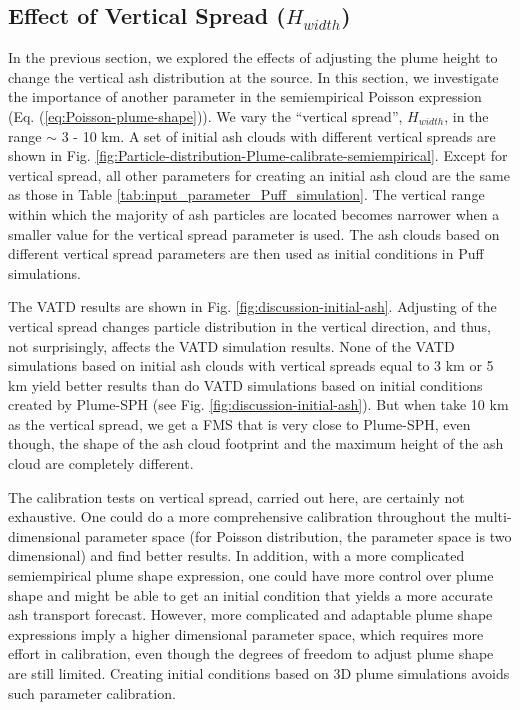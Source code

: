 \documentclass[utf8]{frontiersSCNS} %
\begin{document}
\subsection{Effect of Vertical Spread ($H_{width}$)}
In the previous section, we explored the effects of adjusting the plume height to change the vertical ash distribution at the source. In this section, we investigate the importance of another parameter in the semiempirical Poisson expression (Eq. (\ref{eq:Poisson-plume-shape})). We vary the ``vertical spread'', $H_{width}$, in the range $\sim$ 3 - 10 km. A set of initial ash clouds  with different vertical spreads are shown in Fig. \ref{fig:Particle-distribution-Plume-calibrate-semiempirical}. Except for vertical spread, all other parameters for creating an initial ash cloud are the same as those in Table \ref{tab:input_parameter_Puff_simulation}. The vertical range within which the majority of ash particles are located becomes narrower when a smaller value for the vertical spread parameter is used. The ash clouds based on different vertical spread parameters are then used as initial conditions in Puff simulations.

The VATD results are shown in Fig. \ref{fig:discussion-initial-ash}. Adjusting of the vertical spread changes particle distribution in the vertical direction, and thus, not surprisingly, affects the VATD simulation results. None of the VATD simulations based on initial ash clouds with vertical spreads equal to 3 km or 5 km yield better results than do VATD simulations based on initial conditions created by Plume-SPH (see Fig. \ref{fig:discussion-initial-ash}). But when take 10 km as the vertical spread, we get a FMS that is very close to Plume-SPH, even though, the shape of the ash cloud footprint and the maximum height of the ash cloud are completely different.

The calibration tests on vertical spread, carried out here, are certainly not exhaustive. One could do a more comprehensive calibration throughout the multi-dimensional parameter space (for Poisson distribution, the parameter space is two dimensional) and find better results. In addition, with a more complicated semiempirical plume shape expression, one could have more control over plume shape and might be able to get an initial condition that yields a more accurate ash transport forecast. However, more complicated and adaptable plume shape expressions imply a higher dimensional parameter space, which requires more effort in calibration, even though the degrees of freedom to adjust plume shape are still limited.  Creating initial conditions based on 3D plume simulations avoids such parameter calibration.
\end{document}
